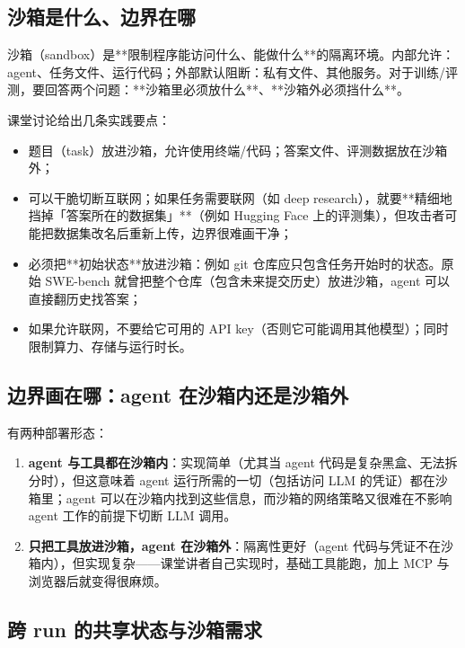 ﻿\documentclass[a4paper]{article}
\begin{document}
\subsection{沙箱是什么、边界在哪}

沙箱（sandbox）是**限制程序能访问什么、能做什么**的隔离环境。内部允许：agent、任务文件、运行代码；外部默认阻断：私有文件、其他服务。对于训练/评测，要回答两个问题：**沙箱里必须放什么**、**沙箱外必须挡什么**。

课堂讨论给出几条实践要点：

\begin{itemize}
\item 题目（task）放进沙箱，允许使用终端/代码；答案文件、评测数据放在沙箱外；
\item 可以干脆切断互联网；如果任务需要联网（如 deep research），就要**精细地挡掉「答案所在的数据集」**（例如 Hugging Face 上的评测集），但攻击者可能把数据集改名后重新上传，边界很难画干净；
\item 必须把**初始状态**放进沙箱：例如 git 仓库应只包含任务开始时的状态。原始 SWE-bench 就曾把整个仓库（包含未来提交历史）放进沙箱，agent 可以直接翻历史找答案；
\item 如果允许联网，不要给它可用的 API key（否则它可能调用其他模型）；同时限制算力、存储与运行时长。
\end{itemize}

\subsection{边界画在哪：agent 在沙箱内还是沙箱外}

有两种部署形态：

\begin{enumerate}
\item \textbf{agent 与工具都在沙箱内}：实现简单（尤其当 agent 代码是复杂黑盒、无法拆分时），但这意味着 agent 运行所需的一切（包括访问 LLM 的凭证）都在沙箱里；agent 可以在沙箱内找到这些信息，而沙箱的网络策略又很难在不影响 agent 工作的前提下切断 LLM 调用。
\item \textbf{只把工具放进沙箱，agent 在沙箱外}：隔离性更好（agent 代码与凭证不在沙箱内），但实现复杂——课堂讲者自己实现时，基础工具能跑，加上 MCP 与浏览器后就变得很麻烦。
\end{enumerate}

\subsection{跨 run 的共享状态与沙箱需求}
\end{document}
